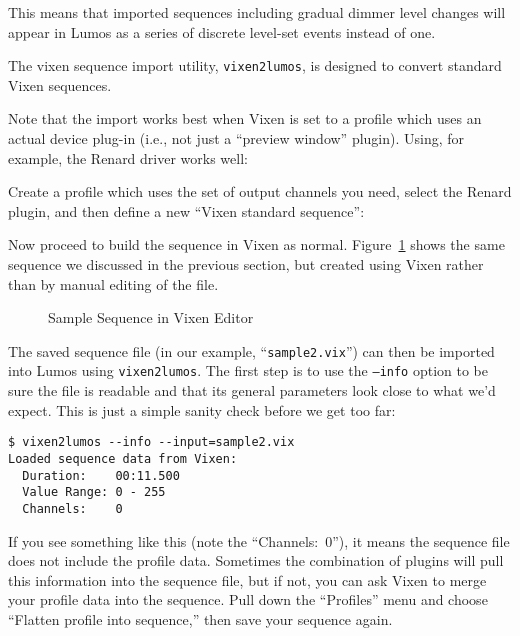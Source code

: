 \documentclass{article}
\begin{document}
This means that imported sequences including gradual dimmer level changes will
appear in Lumos as a series of discrete level-set events instead of one.  

The vixen sequence import utility, {\tt vixen2lumos}, is designed to convert
standard Vixen sequences.  

Note that the import works best when Vixen is set to a profile which uses an
actual device plug-in (i.e., not just a ``preview window'' plugin).  Using,
for example, the Renard driver works well:

\noindent%

Create a profile which uses the set of output channels you need, select the
Renard plugin, and then define a new ``Vixen standard sequence'':

\noindent%

Now proceed to build the sequence in Vixen as normal.  Figure~\ref{vix:seq}
shows the same sequence we discussed in the previous section, but created
using Vixen rather than by manual editing of the file.

\begin{figure}[p]
\caption{Sample Sequence in Vixen Editor}
\label{vix:seq}
\end{figure}

The saved sequence file (in our example, ``{\tt sample2.vix}'') can then be
imported into Lumos using {\tt vixen2lumos}.  The first step is to use the
{\tt --info} option to be sure the file is readable and that its general
parameters look close to what we'd expect.  This is just a simple sanity check
before we get too far:
\begin{verbatim}
$ vixen2lumos --info --input=sample2.vix
Loaded sequence data from Vixen:
  Duration:    00:11.500
  Value Range: 0 - 255
  Channels:    0
\end{verbatim}

If you see something like this (note the ``Channels:~0''), it means the
sequence file does not include the profile data.  Sometimes the combination of
plugins will pull this information into the sequence file, but if not, you can
ask Vixen to merge your profile data into the sequence.  Pull down the
``Profiles'' menu and choose ``Flatten profile into sequence,'' then save your
sequence again.
\end{document}
